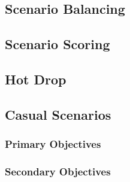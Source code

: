 

\subsection{Scenario Balancing}



\subsection{Scenario Scoring}



\newpage

\subsection{Hot Drop}



\newpage

\subsection{Casual Scenarios}



\subsubsection{Primary Objectives}



\subsubsection{Secondary Objectives}

